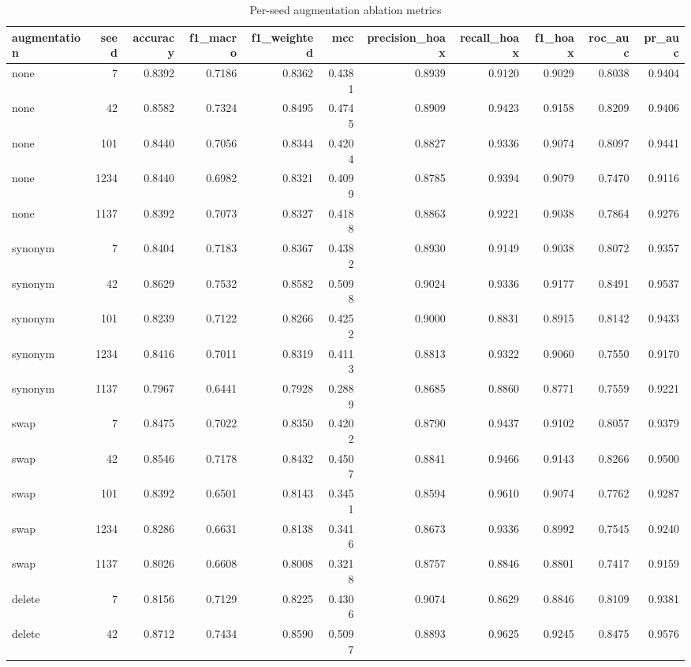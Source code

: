 \begin{table}
\caption{Per-seed augmentation ablation metrics}
\label{tab:aug_ablation_per_seed}
\begin{tabular}{lrrrrrrrrrr}
\toprule
augmentation & seed & accuracy & f1\_macro & f1\_weighted & mcc & precision\_hoax & recall\_hoax & f1\_hoax & roc\_auc & pr\_auc \\
\midrule
none & 7 & 0.8392 & 0.7186 & 0.8362 & 0.4381 & 0.8939 & 0.9120 & 0.9029 & 0.8038 & 0.9404 \\
none & 42 & 0.8582 & 0.7324 & 0.8495 & 0.4745 & 0.8909 & 0.9423 & 0.9158 & 0.8209 & 0.9406 \\
none & 101 & 0.8440 & 0.7056 & 0.8344 & 0.4204 & 0.8827 & 0.9336 & 0.9074 & 0.8097 & 0.9441 \\
none & 1234 & 0.8440 & 0.6982 & 0.8321 & 0.4099 & 0.8785 & 0.9394 & 0.9079 & 0.7470 & 0.9116 \\
none & 1137 & 0.8392 & 0.7073 & 0.8327 & 0.4188 & 0.8863 & 0.9221 & 0.9038 & 0.7864 & 0.9276 \\
synonym & 7 & 0.8404 & 0.7183 & 0.8367 & 0.4382 & 0.8930 & 0.9149 & 0.9038 & 0.8072 & 0.9357 \\
synonym & 42 & 0.8629 & 0.7532 & 0.8582 & 0.5098 & 0.9024 & 0.9336 & 0.9177 & 0.8491 & 0.9537 \\
synonym & 101 & 0.8239 & 0.7122 & 0.8266 & 0.4252 & 0.9000 & 0.8831 & 0.8915 & 0.8142 & 0.9433 \\
synonym & 1234 & 0.8416 & 0.7011 & 0.8319 & 0.4113 & 0.8813 & 0.9322 & 0.9060 & 0.7550 & 0.9170 \\
synonym & 1137 & 0.7967 & 0.6441 & 0.7928 & 0.2889 & 0.8685 & 0.8860 & 0.8771 & 0.7559 & 0.9221 \\
swap & 7 & 0.8475 & 0.7022 & 0.8350 & 0.4202 & 0.8790 & 0.9437 & 0.9102 & 0.8057 & 0.9379 \\
swap & 42 & 0.8546 & 0.7178 & 0.8432 & 0.4507 & 0.8841 & 0.9466 & 0.9143 & 0.8266 & 0.9500 \\
swap & 101 & 0.8392 & 0.6501 & 0.8143 & 0.3451 & 0.8594 & 0.9610 & 0.9074 & 0.7762 & 0.9287 \\
swap & 1234 & 0.8286 & 0.6631 & 0.8138 & 0.3416 & 0.8673 & 0.9336 & 0.8992 & 0.7545 & 0.9240 \\
swap & 1137 & 0.8026 & 0.6608 & 0.8008 & 0.3218 & 0.8757 & 0.8846 & 0.8801 & 0.7417 & 0.9159 \\
delete & 7 & 0.8156 & 0.7129 & 0.8225 & 0.4306 & 0.9074 & 0.8629 & 0.8846 & 0.8109 & 0.9381 \\
delete & 42 & 0.8712 & 0.7434 & 0.8590 & 0.5097 & 0.8893 & 0.9625 & 0.9245 & 0.8475 & 0.9576 \\

\end{tabular}
\end{table}
